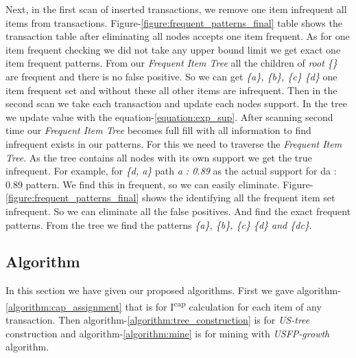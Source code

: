     Next, in the first scan of inserted transactions, we remove one item infrequent all items from transactions. Figure-\ref{figure:frequent_patterns_final} table shows the transaction table after eliminating all nodes accepts one item frequent. As for one item frequent checking we did not take any upper bound limit we get exact one item frequent patterns. From our \emph{Frequent Item Tree} all the children of \emph{root \{\}} are frequent and there is no false positive. So we can get \emph{\{a\}, \{b\}, \{c\} \{d\}} one item frequent set and without these all other items are infrequent.  Then in the second scan we take each transaction and update each nodes support. In the tree we update value with the equation-\ref{equation:exp_sup}. After scanning second time our \emph{Frequent Item Tree} becomes full fill with all information to find infrequent exists in our patterns. For this we need to traverse the \emph{Frequent Item Tree}. As the tree contains all nodes with its own support we get the true infrequent. For example, for \emph{\{d, a\}} path \emph{a : 0.89} as the actual support for {da : 0.89} pattern. We find this in frequent, so we can easily eliminate. Figure-\ref{figure:frequent_patterns_final} shows the identifying all the frequent item set infrequent. So we can eliminate all the false positives.    And find the exact frequent patterns. From the tree we find the patterns \emph{\{a\}, \{b\}, \{c\} \{d\} and \{dc\}}.
    
\clearpage    
    \subsection{Algorithm}
    In this section we have given our proposed algorithms. First we gave algorithm-\ref{algorithm:cap_assignment} that is for I\textsuperscript{cap} calculation for each item of any transaction. Then algorithm-\ref{algorithm:tree_construction} is for \emph{US-tree} construction and algorithm-\ref{algorithm:mine} is for mining with \emph{USFP-growth} algorithm.
    
\clearpage
